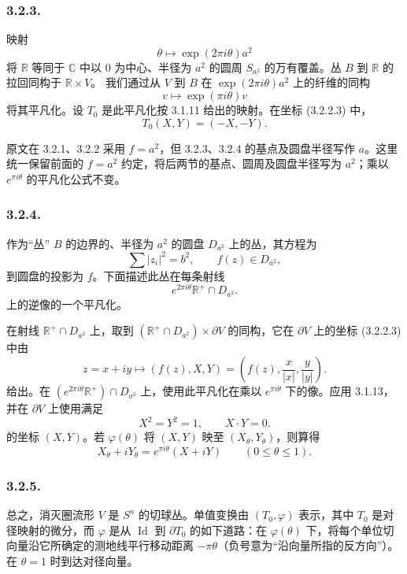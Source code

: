\subsubsection*{3.2.3.}
映射
\[
\theta\longmapsto \exp(2\pi i\theta)a^2
\]
将 $\mathbb R$ 等同于 $\mathbb C$ 中以 $0$ 为中心、半径为 $a^2$ 的圆周 $S_{a^2}$ 的万有覆盖。丛 $B$ 到 $\mathbb R$ 的拉回同构于 $\mathbb R\times V$。
我们通过从 $V$ 到 $B$ 在 $\exp(2\pi i\theta)a^2$ 上的纤维的同构
\[
v\longmapsto \exp(\pi i\theta)v
\]
将其平凡化。设 $T_0$ 是此平凡化按 3.1.11 给出的映射。在坐标 (3.2.2.3) 中，
\[
T_0(X,Y)=(-X,-Y).
\]
\begin{editorialnote}
原文在 3.2.1、3.2.2 采用 $f=a^2$，但 3.2.3、3.2.4 的基点及圆盘半径写作 $a$。这里统一保留前面的 $f=a^2$ 约定，将后两节的基点、圆周及圆盘半径写为 $a^2$；乘以 $e^{\pi i\theta}$ 的平凡化公式不变。
\end{editorialnote}

\subsubsection*{3.2.4.}
作为“丛” $B$ 的边界的、半径为 $a^2$ 的圆盘 $D_{a^2}$ 上的丛，其方程为
\[
\sum |z_i|^2=b^2,
\qquad
f(z)\in D_{a^2},
\]
到圆盘的投影为 $f$。下面描述此丛在每条射线
\[
e^{2\pi i\theta}\mathbb R^+\cap D_{a^2}.
\]
上的逆像的一个平凡化。

在射线 $\mathbb R^+\cap D_{a^2}$ 上，取到 $(\mathbb R^+\cap D_{a^2})\times\partial V$ 的同构，它在 $\partial V$ 上的坐标 (3.2.2.3) 中由
\[
z=x+iy\longmapsto(f(z),X,Y)
  =\left(f(z),\frac{x}{|x|},\frac{y}{|y|}\right).
\]
给出。在 $(e^{2\pi i\theta}\mathbb R^+)\cap D_{a^2}$ 上，使用此平凡化在乘以 $e^{\pi i\theta}$ 下的像。应用 3.1.13，并在 $\partial V$ 上使用满足
\begin{equation}\tag{3.2.4.1}
X^2=Y^2=1,
\qquad
X\mathbin{\cdot}Y=0.
\end{equation}
的坐标 $(X,Y)$。若 $\varphi(\theta)$ 将 $(X,Y)$ 映至 $(X_\theta,Y_\theta)$，则算得
\begin{equation}\tag{3.2.4.2}
X_\theta+iY_\theta
=e^{\pi i\theta}(X+iY)
\qquad(0\leq\theta\leq1).
\end{equation}

\subsubsection*{3.2.5.}
总之，消灭圈流形 $V$ 是 $S^n$ 的切球丛。单值变换由 $(T_0,\varphi)$ 表示，其中 $T_0$ 是对径映射的微分，而 $\varphi$ 是从 $\operatorname{Id}$ 到 $\partial T_0$ 的如下道路：在 $\varphi(\theta)$ 下，将每个单位切向量沿它所确定的测地线平行移动距离 $-\pi\theta$（负号意为“沿向量所指的反方向”）。在 $\theta=1$ 时到达对径向量。


